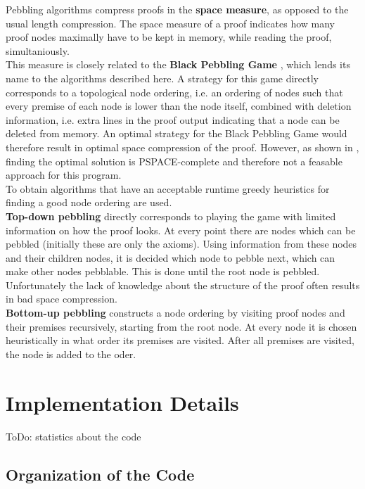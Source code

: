 \documentclass{llncs}
\begin{document}
Pebbling algorithms compress proofs in the \textbf{space measure}, as opposed to the usual length compression. The space measure of a proof indicates how many proof nodes maximally have to be kept in memory, while reading the proof, simultaniously.\\
This measure is closely related to the \textbf{Black Pebbling Game} \cite{gilbert1980pebbling}, which lends its name to the algorithms described here. A strategy for this game directly corresponds to a topological node ordering, i.e. an ordering of nodes such that every premise of each node is lower than the node itself, combined with deletion information, i.e. extra lines in the proof output indicating that a node can be deleted from memory. An optimal strategy for the Black Pebbling Game would therefore result in optimal space compression of the proof. However, as shown in \cite{gilbert1980pebbling}, finding the optimal solution is PSPACE-complete and therefore not a feasable approach for this program.\\
To obtain algorithms that have an acceptable runtime greedy heuristics for finding a good node ordering are used.\\
\textbf{Top-down pebbling} directly corresponds to playing the game with limited information on how the proof looks. At every point there are nodes which can be pebbled (initially these are only the axioms). Using information from these nodes and their children nodes, it is decided which node to pebble next, which can make other nodes pebblable. This is done until the root node is pebbled. Unfortunately the lack of knowledge about the structure of the proof often results in bad space compression.\\
\textbf{Bottom-up pebbling} constructs a node ordering by visiting proof nodes and their premises recursively, starting from the root node. At every node it is chosen heuristically in what order its premises are visited. After all premises are visited, the node is added to the oder.

\section{Implementation Details}

ToDo: statistics about the code

\subsection{Organization of the Code}
\end{document}
